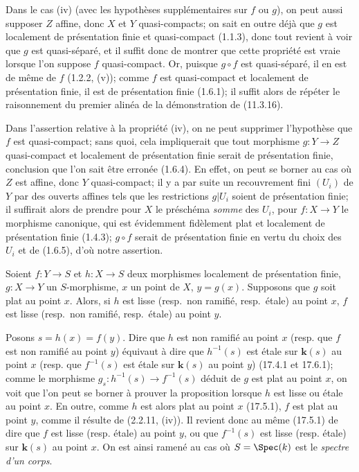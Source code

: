 Dans le cas (iv) (avec les hypothèses supplémentaires sur $f$ ou $g$), on peut aussi supposer $Z$ affine, donc $X$ et $Y$ quasi-compacts; on sait en outre déjà que $g$ est localement de présentation finie et quasi-compact (1.1.3), donc tout revient à voir que $g$ est quasi-séparé, et il suffit donc de montrer que cette propriété est vraie lorsque l'on suppose $f$ quasi-compact. Or, puisque $g\circ f$ est quasi-séparé, il en est de même de $f$ (1.2.2, (v)); comme $f$ est quasi-compact et localement de présentation finie, il est de présentation finie (1.6.1); il suffit alors de répéter le raisonnement du premier alinéa de la démonstration de (11.3.16).

\begin{remark}[17.7.6]
\label{IV.17.7.6}
Dans l'assertion relative à la propriété (iv), on ne peut supprimer l'hypothèse que $f$ est quasi-compact; sans quoi, cela impliquerait que tout morphisme $g:Y\to Z$ quasi-compact et localement de présentation finie serait de présentation finie, conclusion que l'on sait être erronée (1.6.4). En effet, on peut se borner au cas où $Z$ est affine, donc $Y$ quasi-compact; il y a par suite un recouvrement fini $(U_i)$ de $Y$ par des ouverts affines tels que les restrictions $g|U_i$ soient de présentation finie; il suffirait alors de prendre pour $X$ le préschéma \emph{somme} des $U_i$, pour $f:X\to Y$ le morphisme canonique, qui est évidemment fidèlement plat et localement de présentation finie (1.4.3); $g\circ f$ serait de présentation finie en vertu du choix des $U_i$ et de (1.6.5), d'où notre assertion.
\end{remark}

\begin{proposition}[17.7.7]
\label{IV.17.7.7}
Soient $f:Y\to S$ et $h:X\to S$ deux morphismes localement de présentation finie, $g:X\to Y$ un $S$-morphisme, $x$ un point de $X$, $y=g(x)$. Supposons que $g$ soit \textup{plat} au point $x$. Alors, si $h$ est lisse \textup{(resp.}\ non ramifié, \textup{resp.}\ étale\textup{)} au point $x$, $f$ est lisse \textup{(resp.}\ non ramifié, \textup{resp.}\ étale\textup{)} au point $y$.
\end{proposition}

Posons $s=h(x)=f(y)$. Dire que $h$ est non ramifié au point $x$ (resp. que $f$ est non ramifié au point $y$) équivaut à dire que $h^{-1}(s)$ est étale sur $\boldsymbol{k}(s)$ au point $x$ (resp. que $f^{-1}(s)$ est étale sur $\boldsymbol{k}(s)$ au point $y$) (17.4.1 et 17.6.1); comme le morphisme $g_s:h^{-1}(s)\to f^{-1}(s)$ déduit de $g$ est plat au point $x$, on voit que l'on peut se borner à prouver la proposition lorsque $h$ est lisse ou étale au point $x$. En outre, comme $h$ est alors plat au point $x$ (17.5.1), $f$ est plat au point $y$, comme il résulte de (2.2.11, (iv)). Il revient donc au même (17.5.1) de dire que $f$ est lisse (resp. étale) au point $y$, ou que $f^{-1}(s)$ est lisse (resp. étale) sur $\boldsymbol{k}(s)$ au point $x$. On est ainsi ramené au cas où $S=\Spec(k)$ est le \emph{spectre d'un corps}.

